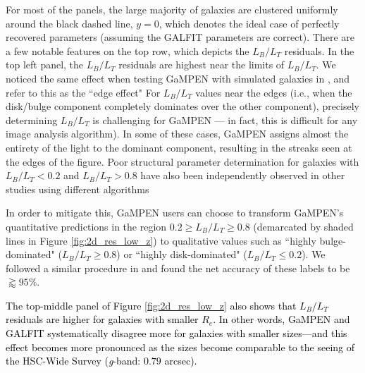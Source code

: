 \documentclass[linenumbers,twocolumn,twocolappendix]{aastex631}
\newcommand\gampen{GaMPEN}
\begin{document}
\begin{CJK*}{UTF8}{gbsn}
For most of the panels, the large majority of galaxies are clustered uniformly around the black dashed line, $y = 0$, which denotes the ideal case of perfectly recovered parameters (assuming the GALFIT parameters are correct). There are a few notable features on the top row, which depicts the $L_B/L_T$ residuals.  In the top left panel, the $L_B/L_T$ residuals are highest near the limits of $L_B/L_T$. We noticed the same effect when testing \gampen{} with simulated galaxies in \citet{gampen_software_paper}, and refer to this as the ``edge effect" 
For $L_B/L_T$ values near the edges (i.e., when the disk/bulge component completely dominates over the other component), precisely determining $L_B/L_T$ is challenging for \gampen{} --- in fact, this is difficult for any image analysis algorithm). In some of these cases, \gampen{} assigns almost the entirety of the light to the dominant component, resulting in the streaks seen at the edges of the figure. Poor structural parameter determination for galaxies with $L_B/L_T < 0.2$ and $L_B/L_T>0.8$ have also been independently observed in other studies using different algorithms \citep[e.g.,][]{euclid_morph, galapagos}


In order to mitigate this, \gampen{} users can choose to transform \gampen{}'s quantitative predictions in the region $0.2 \geq L_B/L_T \geq 0.8$ (demarcated by shaded lines in Figure \ref{fig:2d_res_low_z}) to qualitative values such as ``highly bulge-dominated" ($L_B/L_T \geq 0.8$) or ``highly disk-dominated" ($L_B/L_T \leq 0.2$). We followed a similar procedure in \citet{gampen_software_paper} and found the net accuracy of these labels to be $\gtrapprox95\%$.

\textcolor{black}{The top-middle panel of Figure \ref{fig:2d_res_low_z} also shows that $L_B/L_T$ residuals are higher for galaxies with smaller $R_e$. In other words, \gampen{} and GALFIT systematically disagree more for galaxies with smaller sizes---and this effect becomes more pronounced as the sizes become comparable to the seeing of the HSC-Wide Survey (\textit{g}-band: $0.79$ arcsec).} 


\end{CJK*}
\end{document}
